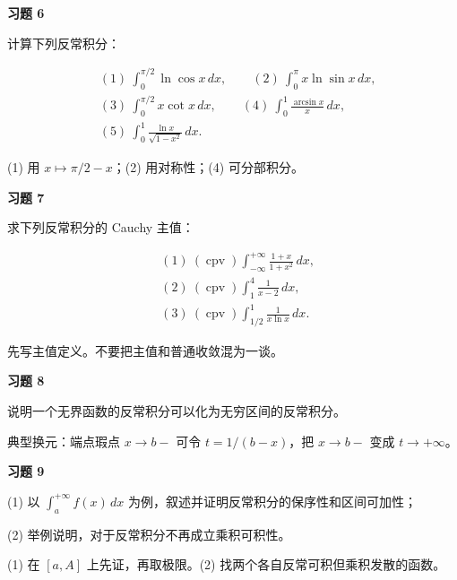 \begin{exercisebox}
\textbf{习题 6 }

计算下列反常积分：

\[
      \begin{aligned}
      &(1)\ \int_0^{\pi/2}\ln\cos x\,dx,\qquad
      (2)\ \int_0^\pi x\ln\sin x\,dx,\\
      &(3)\ \int_0^{\pi/2}x\cot x\,dx,\qquad
      (4)\ \int_0^1\frac{\arcsin x}{x}\,dx,\\
      &(5)\ \int_0^1\frac{\ln x}{\sqrt{1-x^2}}\,dx.
      \end{aligned}
      \]

\begin{hintbox}
(1) 用 \(x\mapsto \pi/2-x\)；(2) 用对称性；(4) 可分部积分。
\end{hintbox}
\end{exercisebox}

\begin{exercisebox}
\textbf{习题 7 }

求下列反常积分的 Cauchy 主值：

\[
      \begin{aligned}
      &(1)\ (\operatorname{cpv})\int_{-\infty}^{+\infty}\frac{1+x}{1+x^2}\,dx,\\
      &(2)\ (\operatorname{cpv})\int_1^4\frac{1}{x-2}\,dx,\\
      &(3)\ (\operatorname{cpv})\int_{1/2}^{1}\frac{1}{x\ln x}\,dx.
      \end{aligned}
      \]

\begin{hintbox}
先写主值定义。不要把主值和普通收敛混为一谈。
\end{hintbox}
\end{exercisebox}

\begin{exercisebox}
\textbf{习题 8 }

说明一个无界函数的反常积分可以化为无穷区间的反常积分。

\begin{hintbox}
典型换元：端点瑕点 \(x\to b-\) 可令 \(t=1/(b-x)\)，把 \(x\to b-\) 变成 \(t\to+\infty\)。
\end{hintbox}
\end{exercisebox}

\begin{exercisebox}
\textbf{习题 9 }

(1) 以 \(\int_a^{+\infty}f(x)\,dx\) 为例，叙述并证明反常积分的保序性和区间可加性；

(2) 举例说明，对于反常积分不再成立乘积可积性。

\begin{hintbox}
(1) 在 \([a,A]\) 上先证，再取极限。(2) 找两个各自反常可积但乘积发散的函数。
\end{hintbox}
\end{exercisebox}

